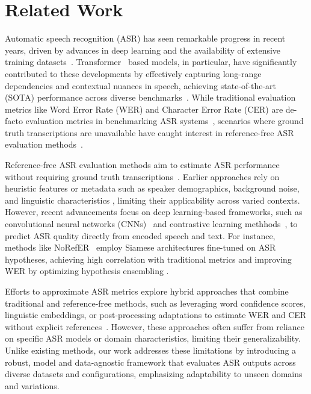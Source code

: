 \section{Related Work}\label{sec:related_work}
Automatic speech recognition (ASR) has seen remarkable progress in recent years, driven by advances in deep learning and the availability of extensive training datasets~\cite{radford2022robustspeechrecognitionlargescale, communication2023seamlessm4tmassivelymultilingual}. Transformer~\cite{vaswani2023attentionneed} based models, in particular, have significantly contributed to these developments by effectively capturing long-range dependencies and contextual nuances in speech, achieving state-of-the-art (SOTA) performance across diverse benchmarks~\cite{kheddar2024automatic,dhanjal2024comprehensive, zimerman2023long}. While traditional evaluation metrics like Word Error Rate (WER) and Character Error Rate (CER) are de-facto evaluation metrics in benchmarking ASR systems~\cite{lin2021speech, park2024character}, scenarios where ground truth transcriptions are unavailable have caught interest in reference-free ASR evaluation methods~\cite{karbasi2022asr, wang2024no, kuhn2024measuring}.

Reference-free ASR evaluation methods aim to estimate ASR performance without requiring ground truth transcriptions~\cite{ospanov2024towards}. Earlier approaches rely on heuristic features or metadata such as speaker demographics, background noise, and linguistic characteristics \cite{litman-etal-2000-predicting, yoon10b_interspeech}, limiting their applicability across varied contexts. However, recent advancements focus on deep learning-based frameworks, such as convolutional neural networks (CNNs)~\cite{elloumi2018asrperformancepredictionunseen} and contrastive learning methhods~\cite{yuksel2023referencelessqualitymetricautomatic}, to predict ASR quality directly from encoded speech and text. For instance, methods like NoRefER~\cite{yuksel2023noreferreferencelessqualitymetric} employ Siamese architectures fine-tuned on ASR hypotheses, achieving high correlation with traditional metrics and improving WER by optimizing hypothesis ensembling \cite{park2024character}.

Efforts to approximate ASR metrics explore hybrid approaches that combine traditional and reference-free methods, such as leveraging word confidence scores, linguistic embeddings, or post-processing adaptations to estimate WER and CER without explicit references~\cite{Ali2020WordER, ali-renals-2018-word, kuhn2024measuring, negri-etal-2014-quality}. However, these approaches often suffer from reliance on specific ASR models or domain characteristics, limiting their generalizability. Unlike existing methods, our work addresses these limitations by introducing a robust, model and data-agnostic framework that evaluates ASR outputs across diverse datasets and configurations, emphasizing adaptability to unseen domains and variations. 


